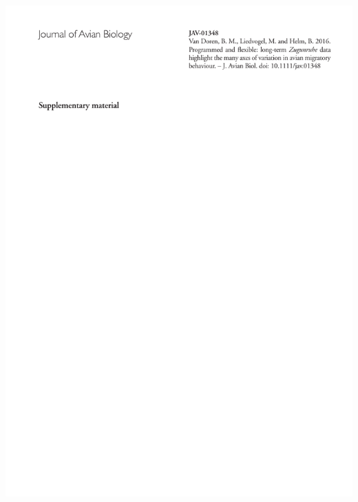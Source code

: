 \documentclass[a4paper, twoside]{templates/ociamthesis}
\begin{document}
\includegraphics[width=1\linewidth]{pdf_chapters/zug/zug_supp_crop_Part1}
\end{document}
